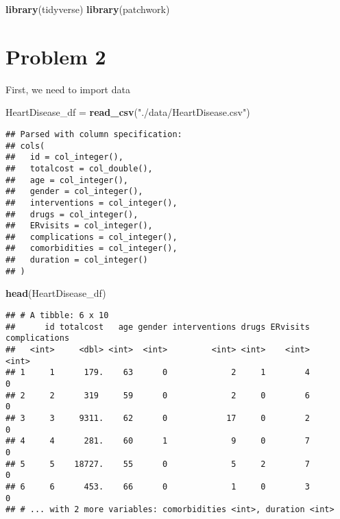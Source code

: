 \documentclass[]{article}
\newenvironment{Shaded}{\begin{snugshade}}{\end{snugshade}}
\newcommand{\KeywordTok}[1]{\textcolor[rgb]{0.13,0.29,0.53}{\textbf{#1}}}
\newcommand{\StringTok}[1]{\textcolor[rgb]{0.31,0.60,0.02}{#1}}
\newcommand{\NormalTok}[1]{#1}
\begin{document}
\begin{Shaded}
\begin{Highlighting}[]
\KeywordTok{library}\NormalTok{(tidyverse)}
\KeywordTok{library}\NormalTok{(patchwork)}
\end{Highlighting}
\end{Shaded}

\section{Problem 2}\label{problem-2}

First, we need to import data

\begin{Shaded}
\begin{Highlighting}[]
\NormalTok{HeartDisease_df =}\StringTok{ }\KeywordTok{read_csv}\NormalTok{(}\StringTok{"./data/HeartDisease.csv"}\NormalTok{) }
\end{Highlighting}
\end{Shaded}

\begin{verbatim}
## Parsed with column specification:
## cols(
##   id = col_integer(),
##   totalcost = col_double(),
##   age = col_integer(),
##   gender = col_integer(),
##   interventions = col_integer(),
##   drugs = col_integer(),
##   ERvisits = col_integer(),
##   complications = col_integer(),
##   comorbidities = col_integer(),
##   duration = col_integer()
## )
\end{verbatim}

\begin{Shaded}
\begin{Highlighting}[]
\KeywordTok{head}\NormalTok{(HeartDisease_df)}
\end{Highlighting}
\end{Shaded}

\begin{verbatim}
## # A tibble: 6 x 10
##      id totalcost   age gender interventions drugs ERvisits complications
##   <int>     <dbl> <int>  <int>         <int> <int>    <int>         <int>
## 1     1      179.    63      0             2     1        4             0
## 2     2      319     59      0             2     0        6             0
## 3     3     9311.    62      0            17     0        2             0
## 4     4      281.    60      1             9     0        7             0
## 5     5    18727.    55      0             5     2        7             0
## 6     6      453.    66      0             1     0        3             0
## # ... with 2 more variables: comorbidities <int>, duration <int>
\end{verbatim}
\end{document}
